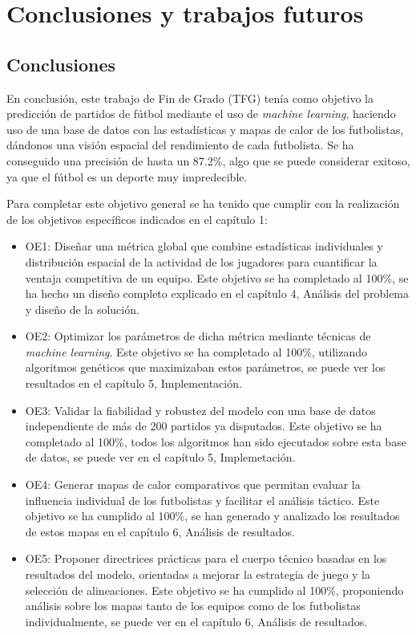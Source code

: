 \chapter{Conclusiones y trabajos futuros}

\section{Conclusiones}

En conclusión, este trabajo de Fin de Grado (TFG) tenía como objetivo la predicción de partidos de fútbol mediante el uso de \textit{machine learning}, haciendo uso de una base de datos con las estadísticas y mapas de calor de los futbolistas, dándonos una visión espacial del rendimiento de cada futbolista. Se ha conseguido una precisión de hasta un 87.2\%, algo que se puede considerar exitoso, ya que el fútbol es un deporte muy impredecible.

Para completar este objetivo general se ha tenido que cumplir con la realización de los objetivos específicos indicados en el capítulo 1:

\begin{itemize}
    \item OE1: Diseñar una métrica global que combine estadísticas individuales y distribución
    espacial de la actividad de los jugadores para cuantificar la ventaja competitiva de un
    equipo. Este objetivo se ha completado al 100\%, se ha hecho un diseño completo explicado en el capítulo 4, Análisis del problema y diseño de la solución.

    \item OE2: Optimizar los parámetros de dicha métrica mediante técnicas de \textit{machine learning}. Este objetivo se ha completado al 100\%, utilizando algoritmos genéticos que maximizaban estos parámetros, se puede ver los resultados en el capítulo 5, Implementación.

    \item OE3: Validar la fiabilidad y robustez del modelo con una base de datos independiente de
    más de 200 partidos ya disputados. Este objetivo se ha completado al 100\%, todos los algoritmos han sido ejecutados sobre esta base de datos, se puede ver en el capítulo 5, Implemetación.

    \item OE4: Generar mapas de calor comparativos que permitan evaluar la influencia individual
    de los futbolistas y facilitar el análisis táctico. Este objetivo se ha cumplido al 100\%, se han generado y analizado los resultados de estos mapas en el capítulo 6, Análisis de resultados.

    \item OE5: Proponer directrices prácticas para el cuerpo técnico basadas en los resultados del modelo, orientadas a mejorar la estrategia de juego y la selección de alineaciones. Este objetivo se ha cumplido al 100\%, proponiendo análisis sobre los mapas tanto de los equipos como de los futbolistas individualmente, se puede ver en el capítulo 6, Análisis de resultados.
    
\end{itemize}

